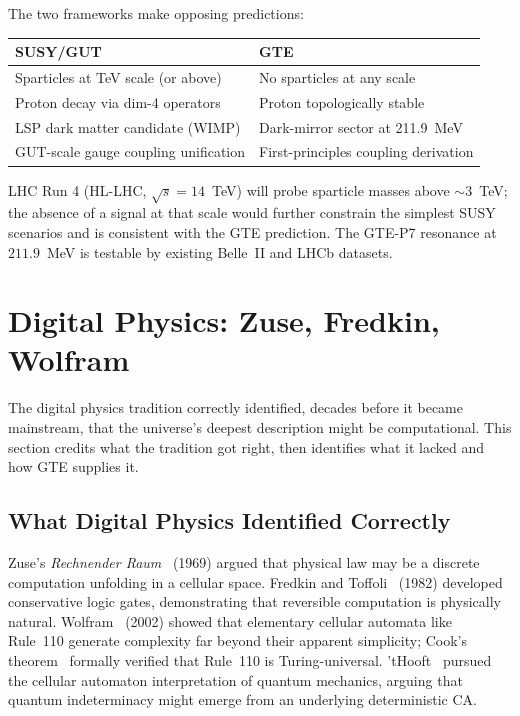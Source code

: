 \documentclass[11pt,openany]{book}
\theoremstyle{remark}
\begin{document}
The two frameworks make opposing predictions:
\begin{center}
\renewcommand{\arraystretch}{1.15}
\begin{tabular}{@{}P{5cm}P{5cm}@{}}
\hline
\textbf{SUSY/GUT} & \textbf{GTE} \\
\hline
Sparticles at TeV scale (or above) & No sparticles at any scale \\
Proton decay via dim-4 operators & Proton topologically stable \\
LSP dark matter candidate (WIMP) & Dark-mirror sector at 211.9~MeV \\
GUT-scale gauge coupling unification & First-principles coupling derivation \\
\hline
\end{tabular}
\end{center}

LHC Run 4 (HL-LHC, $\sqrt{s}=14$~TeV) will probe sparticle masses above $\sim 3$~TeV;
the absence of a signal at that scale would further constrain the simplest SUSY scenarios
and is consistent with the GTE prediction.  The GTE-P7 resonance at $211.9$~MeV is
testable by existing Belle~II and LHCb datasets.

\section{Digital Physics: Zuse, Fredkin, Wolfram}
\label{sec:digital}

The digital physics tradition correctly identified, decades before it became mainstream,
that the universe's deepest description might be computational.  This section credits
what the tradition got right, then identifies what it lacked and how GTE supplies it.

\subsection*{What Digital Physics Identified Correctly}

Zuse's \textit{Rechnender Raum}~\cite{Zuse1969} (1969) argued that physical law may be
a discrete computation unfolding in a cellular space.  Fredkin and
Toffoli~\cite{fredkin1982conservative} (1982) developed conservative logic gates,
demonstrating that reversible computation is physically natural.  Wolfram~\cite{Wolfram2002}
(2002) showed that elementary cellular automata like Rule~110 generate complexity far
beyond their apparent simplicity; Cook's theorem~\cite{Cook2004} formally verified that
Rule~110 is Turing-universal.  'tHooft~\cite{tHooft2016CA} pursued the cellular automaton
interpretation of quantum mechanics, arguing that quantum indeterminacy might emerge from
an underlying deterministic CA.
\end{document}
